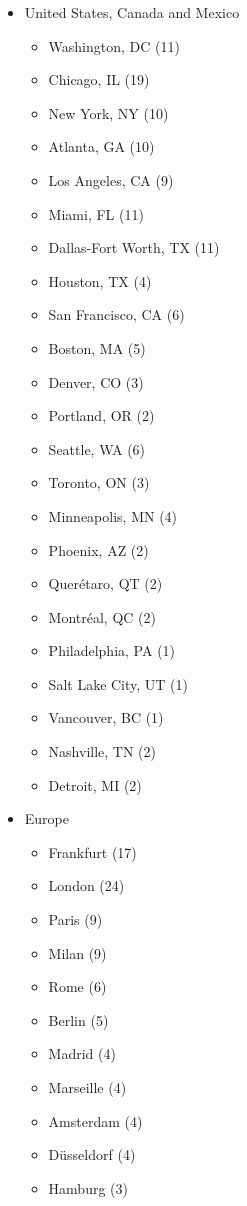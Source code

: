 \begin{itemize}
   \item United States, Canada and Mexico
   \begin{itemize}
     \item Washington, DC (11)
     \item Chicago, IL (19)
     \item New York, NY (10)
     \item Atlanta, GA (10)
     \item Los Angeles, CA (9)
     \item Miami, FL (11)
     \item Dallas-Fort Worth, TX (11)
     \item Houston, TX (4)
     \item San Francisco, CA (6)
     \item Boston, MA (5)
     \item Denver, CO (3)
     \item Portland, OR (2)
     \item Seattle, WA (6)
     \item Toronto, ON (3)
     \item Minneapolis, MN (4)
     \item Phoenix, AZ (2)
     \item Querétaro, QT (2)
     \item Montréal, QC (2)
     \item Philadelphia, PA (1)
     \item Salt Lake City, UT (1)
     \item Vancouver, BC (1)
     \item Nashville, TN (2)
     \item Detroit, MI (2)
   \end{itemize}
   \item Europe
   \begin{itemize}
     \item Frankfurt (17)
     \item London (24)
     \item Paris (9)
     \item Milan (9)
     \item Rome (6)
     \item Berlin (5)
     \item Madrid (4)
     \item Marseille (4)
     \item Amsterdam (4)
     \item Düsseldorf (4)
     \item Hamburg (3)

\end{itemize}
\end{itemize}
